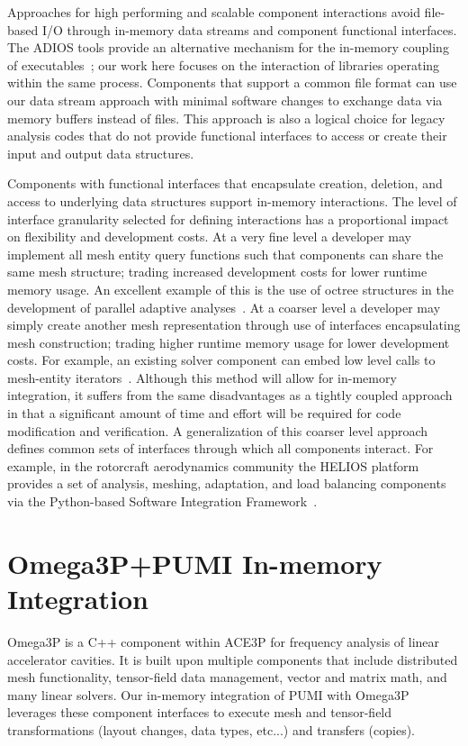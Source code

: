 \documentclass[a4paper]{article}
\begin{document}
Approaches for high performing and scalable component interactions avoid
file-based I/O through in-memory data streams and component functional
interfaces.
The ADIOS tools provide an alternative mechanism for the in-memory coupling of
executables~\cite{bennett2012combining,zhang2012enabling}; our work here focuses
on the interaction of libraries operating within the same process.
Components that support a common file format can use our data stream approach
with minimal software changes to exchange data via memory buffers instead of files.
This approach is also a logical choice for legacy analysis codes that do not
provide functional interfaces to access or create their input and output data
structures.

Components with functional interfaces that encapsulate creation, deletion, and
access to underlying data structures support in-memory interactions.
The level of interface granularity selected for defining interactions has a
proportional impact on flexibility and development costs.
At a very fine level a developer may implement all mesh entity query functions such
that components can share the same mesh structure; trading increased development
costs for lower runtime memory usage.
An excellent example of this is the use of octree structures in the
development of parallel adaptive analyses~\cite{BursteddeWilcoxGhattas11}.
At a coarser level a developer may simply create another mesh
representation through use of interfaces encapsulating mesh construction;
trading higher runtime memory usage for lower development costs.
For example, an existing solver component can embed low level
calls to mesh-entity iterators~\cite{Ollivier10}.
Although this method will allow for in-memory integration, it suffers from the
same disadvantages as a tightly coupled approach in that a significant amount of
time and effort will be required for code modification and verification.
A generalization of this coarser level approach defines common sets of
interfaces through which all components interact.
For example, in the rotorcraft aerodynamics community the HELIOS platform
provides a set of analysis, meshing, adaptation, and load balancing components
via the Python-based Software Integration Framework~\cite{sankaran2010application}.

\section{Omega3P+PUMI In-memory Integration}\label{sec:omega-pumi}

Omega3P is a C++ component within ACE3P for frequency analysis of linear
accelerator cavities.
It is built upon multiple components that include distributed mesh
functionality, tensor-field data management, vector and matrix math, and many
linear solvers.
Our in-memory integration of PUMI with Omega3P leverages these component interfaces to
execute mesh and tensor-field transformations (layout changes, data types, etc...) and 
transfers (copies).
\end{document}
